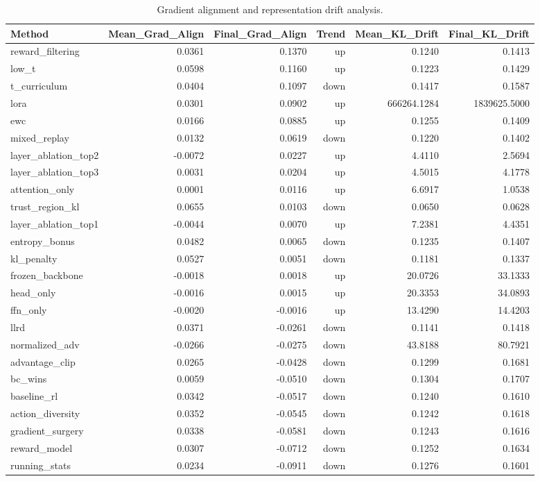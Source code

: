 \begin{table}[htbp]
\centering
\caption{Gradient alignment and representation drift analysis.}
\label{tab:gradient}
\begin{tabular}{lrrrrr}
\toprule
\textbf{Method} & \textbf{Mean\_Grad\_Align} & \textbf{Final\_Grad\_Align} & \textbf{Trend} & \textbf{Mean\_KL\_Drift} & \textbf{Final\_KL\_Drift} \\
\midrule
reward\_filtering & 0.0361 & 0.1370 & up & 0.1240 & 0.1413 \\
low\_t & 0.0598 & 0.1160 & up & 0.1223 & 0.1429 \\
t\_curriculum & 0.0404 & 0.1097 & down & 0.1417 & 0.1587 \\
lora & 0.0301 & 0.0902 & up & 666264.1284 & 1839625.5000 \\
ewc & 0.0166 & 0.0885 & up & 0.1255 & 0.1409 \\
mixed\_replay & 0.0132 & 0.0619 & down & 0.1220 & 0.1402 \\
layer\_ablation\_top2 & -0.0072 & 0.0227 & up & 4.4110 & 2.5694 \\
layer\_ablation\_top3 & 0.0031 & 0.0204 & up & 4.5015 & 4.1778 \\
attention\_only & 0.0001 & 0.0116 & up & 6.6917 & 1.0538 \\
trust\_region\_kl & 0.0655 & 0.0103 & down & 0.0650 & 0.0628 \\
layer\_ablation\_top1 & -0.0044 & 0.0070 & up & 7.2381 & 4.4351 \\
entropy\_bonus & 0.0482 & 0.0065 & down & 0.1235 & 0.1407 \\
kl\_penalty & 0.0527 & 0.0051 & down & 0.1181 & 0.1337 \\
frozen\_backbone & -0.0018 & 0.0018 & up & 20.0726 & 33.1333 \\
head\_only & -0.0016 & 0.0015 & up & 20.3353 & 34.0893 \\
ffn\_only & -0.0020 & -0.0016 & up & 13.4290 & 14.4203 \\
llrd & 0.0371 & -0.0261 & down & 0.1141 & 0.1418 \\
normalized\_adv & -0.0266 & -0.0275 & down & 43.8188 & 80.7921 \\
advantage\_clip & 0.0265 & -0.0428 & down & 0.1299 & 0.1681 \\
bc\_wins & 0.0059 & -0.0510 & down & 0.1304 & 0.1707 \\
baseline\_rl & 0.0342 & -0.0517 & down & 0.1240 & 0.1610 \\
action\_diversity & 0.0352 & -0.0545 & down & 0.1242 & 0.1618 \\
gradient\_surgery & 0.0338 & -0.0581 & down & 0.1243 & 0.1616 \\
reward\_model & 0.0307 & -0.0712 & down & 0.1252 & 0.1634 \\
running\_stats & 0.0234 & -0.0911 & down & 0.1276 & 0.1601 \\
\bottomrule
\end{tabular}
\end{table}